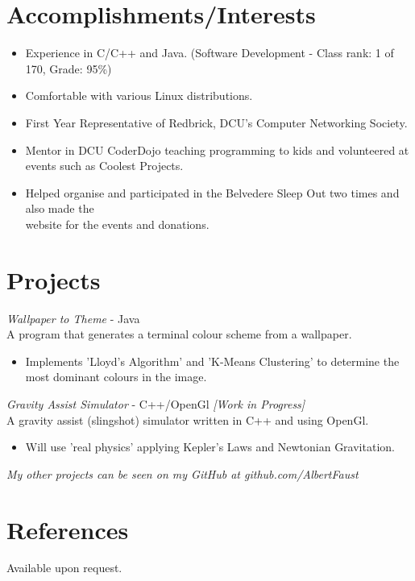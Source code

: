 \documentclass[a4paper,10pt]{article}
\begin{document}
\section{\textbf{Accomplishments/Interests}}
\begin{itemize}
  \item Experience in C/C++ and Java. (Software Development - Class rank: 1 of 170, Grade: 95\%) 
  \item Comfortable with various Linux distributions.
  \item First Year Representative of Redbrick, DCU’s Computer Networking Society.
  \item Mentor in DCU CoderDojo teaching programming to kids and volunteered at events such as Coolest Projects.
  \item Helped organise and participated in the Belvedere Sleep Out two times and also made the \\ website for the events and donations. \end{itemize}

\section{\textbf{Projects}}
\emph{Wallpaper to Theme} - Java\\
A program that generates a terminal colour scheme from a wallpaper.
\begin{itemize}
  \item Implements 'Lloyd's Algorithm' and 'K-Means Clustering' to determine the most dominant colours in the image.\end{itemize}
  \emph{Gravity Assist Simulator} - C++/OpenGl \emph{[Work in Progress]}\\ 
A gravity assist (slingshot) simulator written in C++ and using OpenGl. 
\begin{itemize}
  \item Will use 'real physics' applying Kepler's Laws and Newtonian Gravitation. \end{itemize}
\par{\centering
\emph{My other projects can be seen on my GitHub at github.com/AlbertFaust} \\
}
\section{\textbf{References}}
Available upon request.
\end{document}
